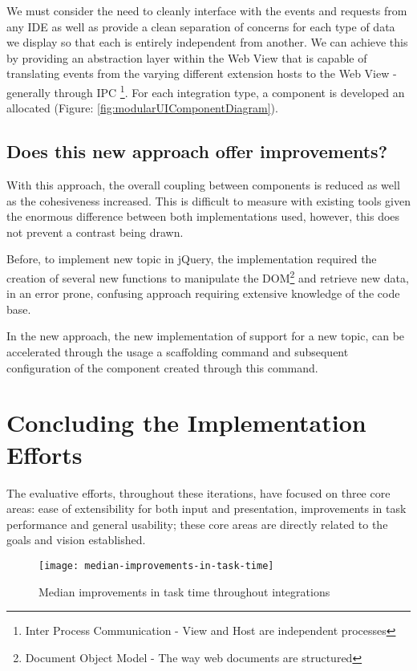 We must consider the need to cleanly interface with the events and requests from  any IDE as well as provide a clean separation of concerns for each type of data we display so that each is entirely independent from another. We can achieve this by providing an abstraction layer within the Web View that is capable of translating events from the varying different extension hosts to the Web View - generally through IPC \footnote{Inter Process Communication - View and Host are independent processes}. For each integration type, a component is developed an allocated (Figure: \ref{fig:modularUIComponentDiagram}). 

\subsection{Does this new approach offer improvements?}

With this approach, the overall coupling between components is reduced as well as the cohesiveness increased. This is difficult to measure with existing tools given the enormous difference between both implementations used, however, this does not prevent a contrast being drawn.

Before, to implement new topic in jQuery, the implementation required the creation of several new functions to manipulate the DOM\footnote{Document Object Model - The way web documents are structured} and retrieve new data, in an error prone, confusing approach requiring extensive knowledge of the code base.

In the new approach, the new implementation of support for a new topic, can be accelerated through the usage a scaffolding command and subsequent configuration of the component created through this command.

\section{Concluding the Implementation Efforts}

The evaluative efforts, throughout these iterations, have focused on three core areas: ease of extensibility for both input and presentation, improvements in task performance and general usability; these core areas are directly related to the goals and vision established.

\begin{figure}[h!]
	\centering
	\texttt{[image: median-improvements-in-task-time]}
	\caption{Median improvements in task time throughout integrations}
	\label{fig:median-improvements-in-task-time}
\end{figure}


